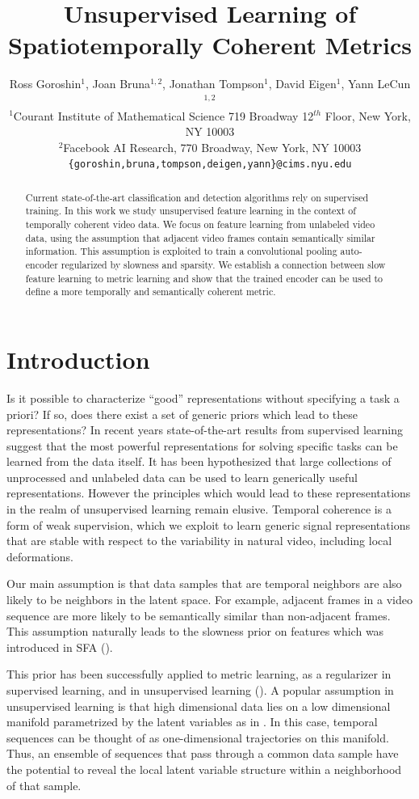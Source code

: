 \documentclass{article} %
\title{Unsupervised Learning of Spatiotemporally Coherent Metrics}
\author{
Ross Goroshin$^1$, Joan Bruna$^{1,2}$, Jonathan Tompson$^1$, David Eigen$^1$, Yann LeCun$^{1,2}$ \\
$^1$Courant Institute of Mathematical Science 
719 Broadway 12$^{th}$ Floor, New York, NY 10003 \\
$^2$Facebook AI Research, 770 Broadway, New York, NY 10003\\
\texttt{\{goroshin,bruna,tompson,deigen,yann\}@cims.nyu.edu}  
}
\begin{document}
\maketitle

\begin{abstract}

Current state-of-the-art classification and detection algorithms rely on supervised training. In this work we study unsupervised feature learning in the context of temporally coherent video data. We focus on feature learning from unlabeled video data, using the assumption that adjacent video frames contain semantically similar information. This assumption is exploited to train a convolutional pooling auto-encoder regularized by slowness and sparsity. We establish a connection between slow feature learning to metric learning and show that the trained encoder can be used to define a more temporally and semantically coherent metric. 
\end{abstract}

\section{Introduction}
Is it possible to characterize ``good'' representations without specifying a task a priori? If so, does there exist a set of generic priors which lead to these representations? In recent years state-of-the-art results from supervised learning suggest that the most powerful representations for solving specific tasks can be learned from the data itself. It has been hypothesized that large collections of unprocessed and unlabeled data can be used to learn generically useful representations. However the principles which would lead to these representations in the realm of unsupervised learning remain elusive. Temporal coherence is a form of weak supervision, which we exploit to learn generic signal representations that are stable with respect to the variability in natural video, including local deformations. 

Our main assumption is that data samples that are temporal neighbors are also likely to be neighbors in the latent space. For example, adjacent frames in a video sequence are more likely to be semantically similar than non-adjacent frames. This assumption naturally leads to the slowness prior on features which was introduced in SFA (\cite{SFA}). 

This prior has been successfully applied to metric learning, as a regularizer in supervised learning, and in unsupervised learning (\cite{DrLIM,DrLIMVideo,SFA}). A popular assumption in unsupervised learning is that high dimensional data lies on a low dimensional manifold  parametrized by the latent variables as in \cite{Bengio2012,CAE,DAE,SATAE}. In this case, temporal sequences can be thought of as one-dimensional trajectories on this manifold. Thus, an ensemble of sequences that pass through a common data sample have the potential to reveal the local latent variable structure within a neighborhood of that sample. 
\end{document}
